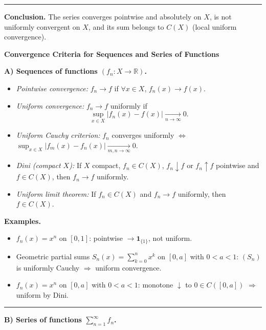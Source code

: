 \documentclass[12pt,a4paper]{article}
\theoremstyle{plain}
\theoremstyle{definition}
\theoremstyle{remark}
\theoremstyle{remark}
\newcommand{\probheader}[1]{%
	\par\vspace{8pt}%
	{\Large\bfseries #1\par}%
	\vspace{6pt}%
}
\newcommand{\sep}{\vspace{6pt}\hrule\vspace{8pt}}
\begin{document}
	\sep
	
	\textbf{Conclusion.}
	The series converges pointwise and absolutely on $X$, is not uniformly convergent on $X$, and its sum belongs to $C(X)$ (local uniform convergence).
	
	\probheader{Convergence Criteria for Sequences and Series of Functions}
	
	\textbf{A) Sequences of functions $(f_n:X\to\mathbb R)$.}
	
	\begin{itemize}
		\item \emph{Pointwise convergence:} $f_n\to f$ if $\forall x\in X$, $f_n(x)\to f(x)$.
		\item \emph{Uniform convergence:} $f_n\to f$ uniformly if
		\[
		\sup_{x\in X}|f_n(x)-f(x)|\xrightarrow[n\to\infty]{}0.
		\]
		\item \emph{Uniform Cauchy criterion:} $f_n$ converges uniformly $\iff$
		$\sup_{x\in X}|f_m(x)-f_n(x)|\xrightarrow[m,n\to\infty]{}0$.
		\item \emph{Dini (compact $X$):} If $X$ compact, $f_n\in C(X)$, $f_n\downarrow f$ or $f_n\uparrow f$
		pointwise and $f\in C(X)$, then $f_n\to f$ uniformly.
		\item \emph{Uniform limit theorem:} If $f_n\in C(X)$ and $f_n\to f$ uniformly, then $f\in C(X)$.
	\end{itemize}
	
	\textbf{Examples.}
	\begin{itemize}
		\item $f_n(x)=x^n$ on $[0,1]$: pointwise $\to \mathbf 1_{\{1\}}$, not uniform.
		\item Geometric partial sums $S_n(x)=\sum_{k=0}^n x^k$ on $[0,a]$ with $0<a<1$:
		$(S_n)$ is uniformly Cauchy $\Rightarrow$ uniform convergence.
		\item $f_n(x)=x^n$ on $[0,a]$ with $0<a<1$:
		monotone $\downarrow$ to $0\in C([0,a])$ $\Rightarrow$ uniform by Dini.
	\end{itemize}
	
	\sep
	
	\textbf{B) Series of functions $\sum_{n=1}^\infty f_n$.}
	
\end{document}
